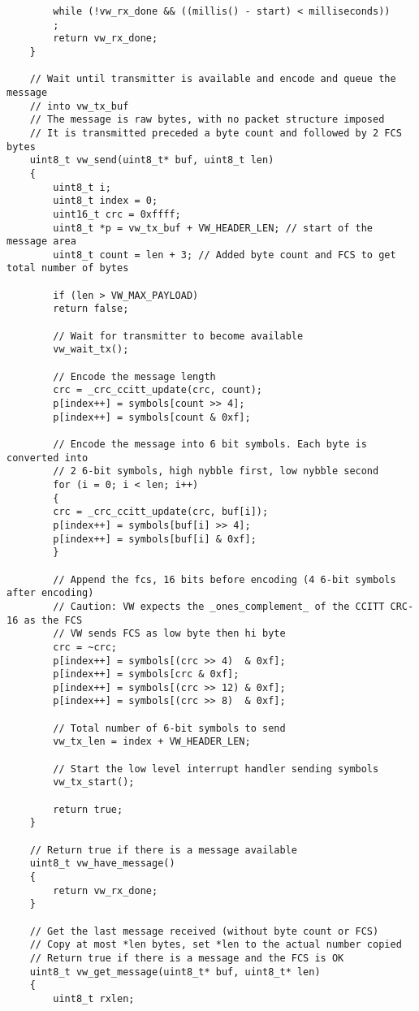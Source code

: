 \begin{verbatim}
        while (!vw_rx_done && ((millis() - start) < milliseconds))
        ;
        return vw_rx_done;
    }

    // Wait until transmitter is available and encode and queue the message
    // into vw_tx_buf
    // The message is raw bytes, with no packet structure imposed
    // It is transmitted preceded a byte count and followed by 2 FCS bytes
    uint8_t vw_send(uint8_t* buf, uint8_t len)
    {
        uint8_t i;
        uint8_t index = 0;
        uint16_t crc = 0xffff;
        uint8_t *p = vw_tx_buf + VW_HEADER_LEN; // start of the message area
        uint8_t count = len + 3; // Added byte count and FCS to get total number of bytes

        if (len > VW_MAX_PAYLOAD)
        return false;

        // Wait for transmitter to become available
        vw_wait_tx();

        // Encode the message length
        crc = _crc_ccitt_update(crc, count);
        p[index++] = symbols[count >> 4];
        p[index++] = symbols[count & 0xf];

        // Encode the message into 6 bit symbols. Each byte is converted into 
        // 2 6-bit symbols, high nybble first, low nybble second
        for (i = 0; i < len; i++)
        {
        crc = _crc_ccitt_update(crc, buf[i]);
        p[index++] = symbols[buf[i] >> 4];
        p[index++] = symbols[buf[i] & 0xf];
        }

        // Append the fcs, 16 bits before encoding (4 6-bit symbols after encoding)
        // Caution: VW expects the _ones_complement_ of the CCITT CRC-16 as the FCS
        // VW sends FCS as low byte then hi byte
        crc = ~crc;
        p[index++] = symbols[(crc >> 4)  & 0xf];
        p[index++] = symbols[crc & 0xf];
        p[index++] = symbols[(crc >> 12) & 0xf];
        p[index++] = symbols[(crc >> 8)  & 0xf];

        // Total number of 6-bit symbols to send
        vw_tx_len = index + VW_HEADER_LEN;

        // Start the low level interrupt handler sending symbols
        vw_tx_start();

        return true;
    }

    // Return true if there is a message available
    uint8_t vw_have_message()
    {
        return vw_rx_done;
    }

    // Get the last message received (without byte count or FCS)
    // Copy at most *len bytes, set *len to the actual number copied
    // Return true if there is a message and the FCS is OK
    uint8_t vw_get_message(uint8_t* buf, uint8_t* len)
    {
        uint8_t rxlen;
        

\end{verbatim}
